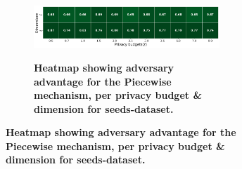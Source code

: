 \begin{figure}[H]
\begin{subfigure}[b]{0.85\textwidth}
    \begin{subfigure}[c]{1\textwidth}
      \caption{\textbf{Heatmap showing adversary advantage for the Piecewise mechanism, per privacy budget \& dimension for seeds-dataset.}}
      \includegraphics[width=1\textwidth]{Results/kd-laplace/piecewise/skewed-dataset/shokri_mi_adv.png}
      \label{fig:privacy_skewed-dataset_adversial_advantage_piecewise}
    \end{subfigure}
  \end{subfigure}
  \hfill %
  \begin{subfigure}[b]{0.075\textwidth}

\end{subfigure}
\end{figure}
